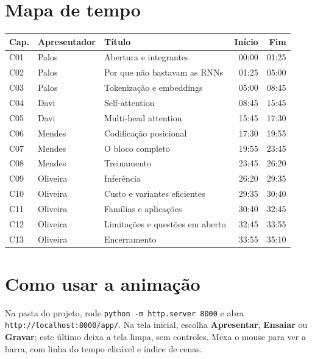 \documentclass[11pt,a4paper]{article}
\begin{document}
\section{Mapa de tempo}
\begin{tabularx}{\linewidth}{llXrr}
\toprule
\textbf{Cap.} & \textbf{Apresentador} & \textbf{Título} & \textbf{Início} & \textbf{Fim} \\
\midrule
C01 & Palos & Abertura e integrantes & 00:00 & 01:25 \\
C02 & Palos & Por que não bastavam as RNNs & 01:25 & 05:00 \\
C03 & Palos & Tokenização e embeddings & 05:00 & 08:45 \\
C04 & Davi & Self-attention & 08:45 & 15:45 \\
C05 & Davi & Multi-head attention & 15:45 & 17:30 \\
C06 & Mendes & Codificação posicional & 17:30 & 19:55 \\
C07 & Mendes & O bloco completo & 19:55 & 23:45 \\
C08 & Mendes & Treinamento & 23:45 & 26:20 \\
C09 & Oliveira & Inferência & 26:20 & 29:35 \\
C10 & Oliveira & Custo e variantes eficientes & 29:35 & 30:40 \\
C11 & Oliveira & Famílias e aplicações & 30:40 & 32:45 \\
C12 & Oliveira & Limitações e questões em aberto & 32:45 & 33:55 \\
C13 & Oliveira & Encerramento & 33:55 & 35:10 \\
\bottomrule
\end{tabularx}
\section{Como usar a animação}
Na pasta do projeto, rode \texttt{python -m http.server 8000} e abra \texttt{http:/\allowbreak{}/\allowbreak{}localhost:8000/\allowbreak{}app/\allowbreak{}}. Na tela inicial, escolha \textbf{Apresentar}, \textbf{Ensaiar} ou \textbf{Gravar}; este último deixa a tela limpa, sem controles. Mexa o mouse para ver a barra, com linha do tempo clicável e índice de cenas.
\end{document}
